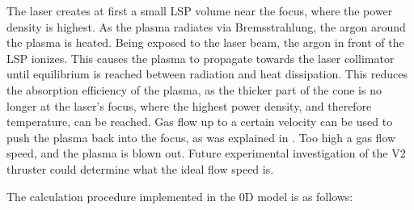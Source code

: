         The laser creates at first a small LSP volume near the focus, where the power density is highest. As the plasma radiates via Bremsstrahlung, the argon around the plasma is heated. Being exposed to the laser beam, the argon in front of the LSP ionizes. This causes the plasma to propagate towards the laser collimator until equilibrium is reached between radiation and heat dissipation. This reduces the absorption efficiency of the plasma, as the thicker part of the cone is no longer at the laser's focus, where the highest power density, and therefore temperature, can be reached. Gas flow up to a certain velocity can be used to push the plasma back into the focus, as was explained in \textcite{chenEmissionSpectroscopyCw1989a}. Too high a gas flow speed, and the plasma is blown out. Future experimental investigation of the V2 thruster could determine what the ideal flow speed is.

        The calculation procedure implemented in the 0D model is as follows:

